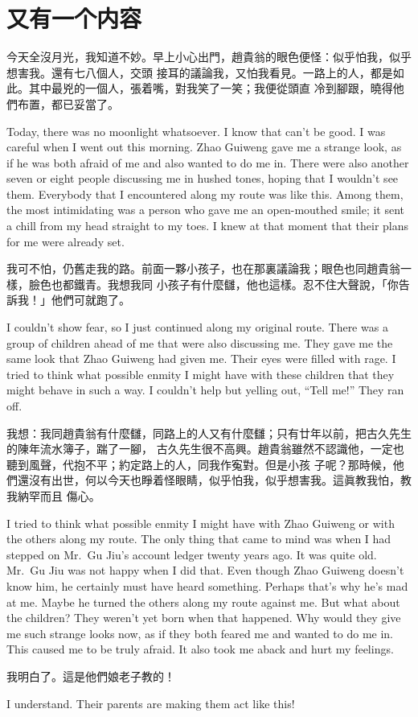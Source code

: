 \documentclass[fontset=none, punct=kaiming]{ctexbook}
\begin{document}
\chapter{又有一个内容}
\begin{paracol}{2}[]

今天全沒月光，我知道不妙。早上小心出門，趙貴翁的眼色便怪：似乎怕我，似乎想害我。還有七八個人，交頭
接耳的議論我，又怕我看見。一路上的人，都是如此。其中最兇的一個人，張着嘴，對我笑了一笑；我便從頭直
冷到腳跟，曉得他們布置，都已妥當了。

\switchcolumn

Today, there was no moonlight whatsoever. I know that can't be good. I was careful when I went out
this morning. Zhao Guiweng gave me a strange look, as if he was both afraid of me and also wanted
to do me in. There were also another seven or eight people discussing me in hushed tones, hoping
that I wouldn't see them. Everybody that I encountered along my route was like this. Among them,
the most intimidating was a person who gave me an open-mouthed smile; it sent a chill from my head
straight to my toes. I knew at that moment that their plans for me were already set.

\switchcolumn*

我可不怕，仍舊走我的路。前面一夥小孩子，也在那裏議論我；眼色也同趙貴翁一樣，臉色也都鐵青。我想我同
小孩子有什麼讎，他也這樣。忍不住大聲說，「你告訴我！」他們可就跑了。

\switchcolumn

I couldn't show fear, so I just continued along my original route. There was a group of children
ahead of me that were also discussing me. They gave me the same look that Zhao Guiweng had given
me. Their eyes were filled with rage. I tried to think what possible enmity I might have with these
children that they might behave in such a way. I couldn't help but yelling out, ``Tell me!'' They
ran off.

\switchcolumn*

我想：我同趙貴翁有什麼讎，同路上的人又有什麼讎；只有廿年以前，把古久先生的陳年流水簿子，踹了一腳，
古久先生很不高興。趙貴翁雖然不認識他，一定也聽到風聲，代抱不平；約定路上的人，同我作寃對。但是小孩
子呢？那時候，他們還沒有出世，何以今天也睜着怪眼睛，似乎怕我，似乎想害我。這眞教我怕，教我納罕而且
傷心。

\switchcolumn

I tried to think what possible enmity I might have with Zhao Guiweng or with the others along my
route. The only thing that came to mind was when I had stepped on Mr.\ Gu Jiu's account ledger
twenty years ago. It was quite old. Mr.\ Gu Jiu was not happy when I did that. Even though Zhao
Guiweng doesn't know him, he certainly must have heard something. Perhaps that's why he's mad at
me. Maybe he turned the others along my route against me. But what about the children? They weren't
yet born when that happened. Why would they give me such strange looks now, as if they both feared
me and wanted to do me in. This caused me to be truly afraid. It also took me aback and hurt my
feelings.

\switchcolumn*

我明白了。這是他們娘老子教的！

\switchcolumn

I understand. Their parents are making them act like this!

\end{paracol}
\end{document}
